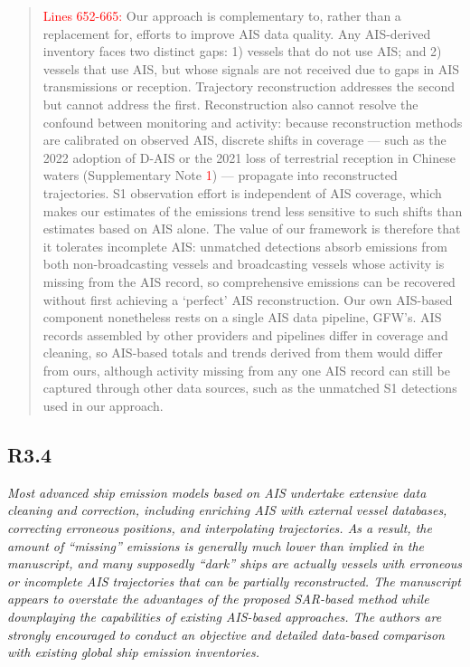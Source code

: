 \documentclass[11pt]{article}
\newcommand{\point}[1]{\subsection*{\normalfont\bfseries #1}}
\begin{document}
\begin{quote}
\textcolor{red}{Lines 652-665:}
Our approach is complementary to, rather than a replacement for, efforts to improve AIS data quality. Any AIS-derived inventory faces two distinct gaps: 1) vessels that do not use AIS; and 2) vessels that use AIS, but whose signals are not received due to gaps in AIS transmissions or reception. Trajectory reconstruction addresses the second but cannot address the first. Reconstruction also cannot resolve the confound between monitoring and activity: because reconstruction methods are calibrated on observed AIS, discrete shifts in coverage — such as the 2022 adoption of D-AIS or the 2021 loss of terrestrial reception in Chinese waters (Supplementary Note \textcolor{red}{1}) — propagate into reconstructed trajectories. S1 observation effort is independent of AIS coverage, which makes our estimates of the emissions trend less sensitive to such shifts than estimates based on AIS alone. The value of our framework is therefore that it tolerates incomplete AIS: unmatched detections absorb emissions from both non-broadcasting vessels and broadcasting vessels whose activity is missing from the AIS record, so comprehensive emissions can be recovered without first achieving a `perfect' AIS reconstruction. Our own AIS-based component nonetheless rests on a single AIS data pipeline, GFW's. AIS records assembled by other providers and pipelines differ in coverage and cleaning, so AIS-based totals and trends derived from them would differ from ours, although activity missing from any one AIS record can still be captured through other data sources, such as the unmatched S1 detections used in our approach.
\end{quote}

\point{R3.4}

\begin{refquote}\itshape
Most advanced ship emission models based on AIS undertake extensive data
cleaning and correction, including enriching AIS with external vessel databases,
correcting erroneous positions, and interpolating trajectories. As a result, the
amount of ``missing'' emissions is generally much lower than implied in the
manuscript, and many supposedly ``dark'' ships are actually vessels with
erroneous or incomplete AIS trajectories that can be partially reconstructed. The
manuscript appears to overstate the advantages of the proposed SAR-based method
while downplaying the capabilities of existing AIS-based approaches. The authors
are strongly encouraged to conduct an objective and detailed data-based
comparison with existing global ship emission inventories.
\end{refquote}
\end{document}
